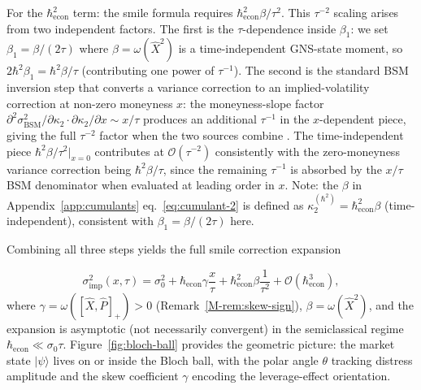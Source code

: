 For the $\hbar_{\mathrm{econ}}^2$ term: the smile formula requires
$\hbar_{\mathrm{econ}}^2\beta/\tau^2$. This $\tau^{-2}$ scaling arises
from two independent factors. The first is the $\tau$-dependence inside
$\beta_1$: we set $\beta_1 = \beta/(2\tau)$ where $\beta = \omega(\hat{X}^2)$
is a time-independent GNS-state moment, so $2\hbar^2\beta_1 = \hbar^2\beta/\tau$
(contributing one power of $\tau^{-1}$). The second is the standard BSM
inversion step that converts a variance correction to an implied-volatility
correction at non-zero moneyness $x$: the moneyness-slope factor
$\partial^2\sigma^2_{\mathrm{BSM}}/\partial\kappa_2 \cdot \partial\kappa_2
/\partial x \sim x/\tau$ produces an additional $\tau^{-1}$ in the $x$-dependent
piece, giving the full $\tau^{-2}$ factor when the two sources combine
\citep{backus2004accounting}. The time-independent piece
$\hbar^2\beta/\tau^2|_{x=0}$ contributes at $\mathcal{O}(\tau^{-2})$
consistently with the zero-moneyness variance correction being $\hbar^2\beta/\tau$,
since the remaining $\tau^{-1}$ is absorbed by the $x/\tau$ BSM denominator
when evaluated at leading order in $x$.
Note: the $\beta$ in Appendix~\ref{app:cumulants} eq.~\eqref{eq:cumulant-2}
is defined as $\kappa_2^{(\hbar^2)} = \hbar_{\mathrm{econ}}^2\beta$
(time-independent), consistent with $\beta_1 = \beta/(2\tau)$ here.

Combining all three steps yields the full smile correction expansion

\begin{equation}\label{eq:full-smile-correction}
    \sigma^2_{\mathrm{imp}}(x, \tau) = \sigma_0^2
    + \hbar_{\mathrm{econ}} \gamma \frac{x}{\tau}
    + \hbar_{\mathrm{econ}}^2 \beta \frac{1}{\tau^2}
    + \mathcal{O}(\hbar_{\mathrm{econ}}^3),
\end{equation}
where $\gamma = \omega([\hat{X}, \hat{P}]_+) > 0$ (Remark~\ref{M-rem:skew-sign}),
$\beta = \omega(\hat{X}^2)$, and the expansion is asymptotic (not necessarily
convergent) in the semiclassical regime
$\hbar_{\mathrm{econ}} \ll \sigma_0\tau$.
Figure~\ref{fig:bloch-ball} provides the geometric picture: the market state
$|\psi\rangle$ lives on or inside the Bloch ball, with the polar angle $\theta$
tracking distress amplitude and the skew coefficient $\gamma$ encoding the
leverage-effect orientation.

